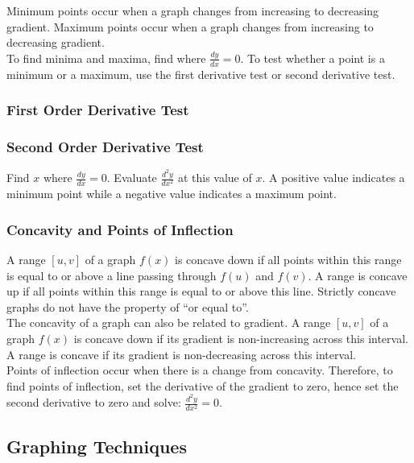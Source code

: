 \documentclass[../main]{subfiles}
\begin{document}
	Minimum points occur when a graph changes from increasing to decreasing gradient. Maximum points occur when a graph changes from increasing to decreasing gradient. \\

	To find minima and maxima, find where \(\frac{dy}{dx} = 0 \). To test whether a point is a minimum or a maximum, use the first derivative test or second derivative test.

	\subsubsection{First Order Derivative Test}

	\subsubsection{Second Order Derivative Test}

	Find \(x\) where \(\frac{dy}{dx} = 0\). Evaluate \(\frac{d^2y}{dx^2}\) at this value of \(x\). A positive value indicates a minimum point while a negative value indicates a maximum point.


	\subsubsection{Concavity and Points of Inflection}

	A range \([u,v]\) of a graph \(f(x)\) is concave down if all points within this range is equal to or above a line passing through \(f(u)\) and \(f(v)\). A range is concave up if all points within this range is equal to or above this line. Strictly concave graphs do not have the property of ``or equal to''. \\

	The concavity of a graph can also be related to gradient. A range \([u,v]\) of a graph \(f(x)\) is concave down if its gradient is  non-increasing across this interval. A range is concave if its gradient is non-decreasing across this interval. \\

	Points of inflection occur when there is a change from concavity. Therefore, to find points of inflection, set the derivative of the gradient to zero, hence set the second derivative to zero and solve: \(\frac{d^2y}{dx^2} = 0\).

\subsection{Graphing Techniques}
\end{document}
